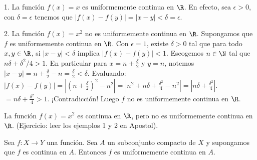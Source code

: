 \begin{example}
1. La función $f(x) = x$ es uniformemente continua en $\R$. %
En efecto, sea $\epsilon > 0$, con $\delta = \epsilon$ tenemos que %
$|f(x) - f(y)| = |x - y| < \delta = \epsilon$. %

2. La función $f(x) = x^2$ no es uniformemente continua en $\R$. %
Supongamos que $f$ es uniformemente continua en $\R$. %
Con $\epsilon = 1$, existe $\delta > 0$ tal que para todo $x, y \in \R$, %
si $|x - y| < \delta$ implica $|f(x) - f(y)| < 1$. %
Escogemos $n \in \N$ tal que $n\delta + \delta^2/4 > 1$. %
En particular para $x = n + \frac{\delta}{2}$ y $y = n$, notemos %
$|x - y| = n + \frac{\delta}{2} - n = \frac{\delta}{2} < \delta$. %
Evaluando: $|f(x) - f(y)| = \left| \left(n + \frac{\delta}{2}\right)^2 - n^2 \right| = \left| n^2 + n\delta + \frac{\delta^2}{4} - n^2 \right| = \left| n\delta + \frac{\delta^2}{4} \right|$. %
$= n\delta + \frac{\delta^2}{4} > 1$. ¡Contradicción! %
Luego $f$ no es uniformemente continua en $\R$. %
\end{example}

\begin{remark}
La función $f(x) = x^2$ es continua en $\R$, pero no es uniformemente continua en $\R$. %
(Ejercicio: leer los ejemplos 1 y 2 en Apostol). %
\end{remark}

\begin{teorema} %
Sea $f: X \to Y$ una función. Sea $A$ un subconjunto compacto de $X$ y supongamos que $f$ es continua en $A$. %
Entonces $f$ es uniformemente continua en $A$. %
\end{teorema}


